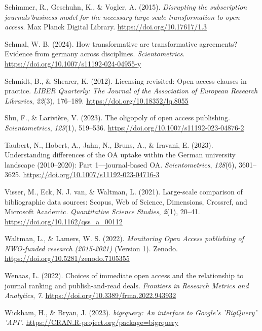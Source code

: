 \documentclass[a4paper,man,floatsintext,longtable,noextraspace,12pt]{apa6}
\newlength{\cslhangindent}
\newenvironment{CSLReferences}[2] %
  {\begin{list}{}{%
   \setlength{\itemindent}{0pt}
   \setlength{\leftmargin}{0pt}
   \setlength{\parsep}{0pt}
   \ifodd #1
    \setlength{\leftmargin}{\cslhangindent}
    \setlength{\itemindent}{-1\cslhangindent}
   \fi
   \setlength{\itemsep}{#2\baselineskip}}}
  {\end{list}}
\begin{document}
\begin{CSLReferences}{1}{0}
Schimmer, R., Geschuhn, K., \& Vogler, A. (2015). \emph{{Disrupting the
subscription journals'business model for the necessary large-scale
transformation to open access}}. Max Planck Digital Library.
\url{https://doi.org/10.17617/1.3}

Schmal, W. B. (2024). How transformative are transformative agreements?
Evidence from germany across disciplines. \emph{Scientometrics}.
\url{https://doi.org/10.1007/s11192-024-04955-y}

Schmidt, B., \& Shearer, K. (2012). Licensing revisited: Open access
clauses in practice. \emph{LIBER Quarterly: The Journal of the
Association of European Research Libraries}, \emph{22}(3), 176--189.
\url{https://doi.org/10.18352/lq.8055}

Shu, F., \& Larivière, V. (2023). The oligopoly of open access
publishing. \emph{Scientometrics}, \emph{129}(1), 519--536.
\url{https://doi.org/10.1007/s11192-023-04876-2}

Taubert, N., Hobert, A., Jahn, N., Bruns, A., \& Iravani, E. (2023).
Understanding differences of the OA uptake within the {German}
university landscape (2010--2020): Part 1---journal-based OA.
\emph{Scientometrics}, \emph{128}(6), 3601--3625.
\url{https://doi.org/10.1007/s11192-023-04716-3}

Visser, M., Eck, N. J. van, \& Waltman, L. (2021). Large-scale
comparison of bibliographic data sources: {Scopus, Web of Science,
Dimensions, Crossref, and Microsoft Academic}. \emph{Quantitative
Science Studies}, \emph{2}(1), 20--41.
\url{https://doi.org/10.1162/qss_a_00112}

Waltman, L., \& Lamers, W. S. (2022). \emph{{Monitoring Open Access
publishing of NWO-funded research (2015-2021)}} (Version 1). Zenodo.
\url{https://doi.org/10.5281/zenodo.7105355}

Wenaas, L. (2022). Choices of immediate open access and the relationship
to journal ranking and publish-and-read deals. \emph{Frontiers in
Research Metrics and Analytics}, \emph{7}.
\url{https://doi.org/10.3389/frma.2022.943932}

Wickham, H., \& Bryan, J. (2023). \emph{{bigrquery: An interface to
Google's 'BigQuery' 'API'}}.
\url{https://CRAN.R-project.org/package=bigrquery}


\end{CSLReferences}
\end{document}
